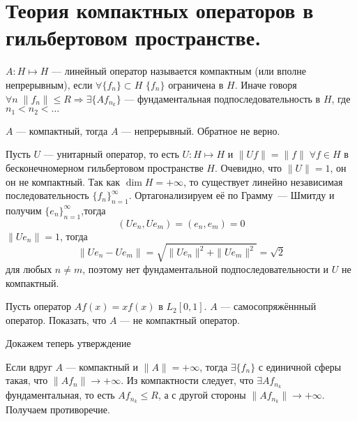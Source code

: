 \documentclass[14pt]{extarticle}
\begin{document}
\section*{Теория компактных операторов в гильбертовом пространстве.}
\begin{Opr}
    $A : H \mapsto H$ --- линейный оператор называется компактным (или вполне 
    непрерывным), если $\forall \{f_n\} \subset
    H$ $\{f_n\}$ ограничена в $H$.
    Иначе говоря $\forall n\; \|f_n\| \le R \Rightarrow \exists \{Af_{n_k}\}$ 
    --- фундаментальная подпоследовательность в $H$, 
    где $n_1 < n_2 < \dots$
\end{Opr}
\begin{Utv}
    $A$ --- компактный, тогда $A$ --- непрерывный.
    Обратное не верно. 
\end{Utv}
\begin{Prim}
    Пусть $U$ --- унитарный оператор, то есть $U : H \mapsto H$ и $\|Uf\| = \|
    f\|\; \forall f \in H$ в
    бесконечномерном гильбертовом пространстве $H$.
    Очевидно, что $\|U\| = 1$, он он не компактный.
    Так как $\dim H = +\infty$, то существует линейно независимая 
    последовательность $\{f_n\}_{n = 1}^{\infty}$.
    Ортагонализируем её по Грамму~--- Шмитду и получим $\{e_n\}_{n = 1}^{\infty}
    $,тогда
    $$
    (U e_n, U e_m) = (e_n, e_m) = 0
    $$
    $\|U e_n\| = 1$, тогда
    $$
    \|U e_n - U e_m\| = \sqrt{\|U e_n\|^2 + \|U e_m\|^2} = \sqrt{2}
    $$
    для любых $n \ne m$, поэтому нет фундаментальной подпоследовательности и 
    $U$ не компактный.
\end{Prim}
\begin{Upr}
    Пусть оператор $A f(x) = x f(x)$ в $L_2[0,1]$.
    $A$ --- самосопряжённный оператор.
    Показать, что $A$ --- не компактный оператор.
\end{Upr}

Докажем теперь утверждение
\begin{Proof}
    Если вдруг $A$ --- компактный и $\|A\| = +\infty$, тогда $\exists \{f_n\}$ 
    с единичной сферы такая, что $\|A f_n\| \to 
    +\infty$.
    Из компактности следует, что $\exists A f_{n_k}$ фундаментальная, то есть 
    $A f_{n_k} \le R$, а с другой стороны 
    $\|A f_{n_k}\| \to +\infty$.
    Получаем противоречие.
\end{Proof}
 
\end{document}
